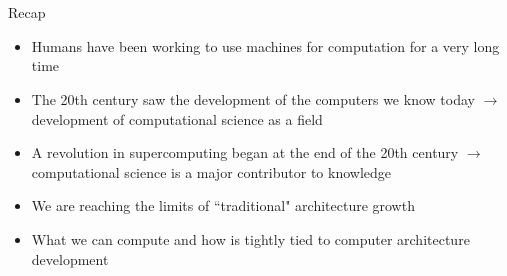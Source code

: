 \documentclass[xcolor=x11names,compress]{beamer}
\renewcommand{\(}{\begin{columns}}
\renewcommand{\)}{\end{columns}}
\newcommand{\<}[1]{\begin{column}{#1}}
\renewcommand{\>}{\end{column}}
\begin{document}
\section*{}
\begin{frame}{Recap}
\begin{itemize}
\item Humans have been working to use machines for computation for a very long time
\item The 20th century saw the development of the computers we know today $\rightarrow$ development of computational science as a field
\item A revolution in supercomputing began at the end of the 20th century $\rightarrow$ computational science is a major contributor to knowledge
\item We are reaching the limits of ``traditional" architecture growth
\item What we can compute and how is tightly tied to computer architecture development
\end{itemize}
\end{frame}
\end{document}
